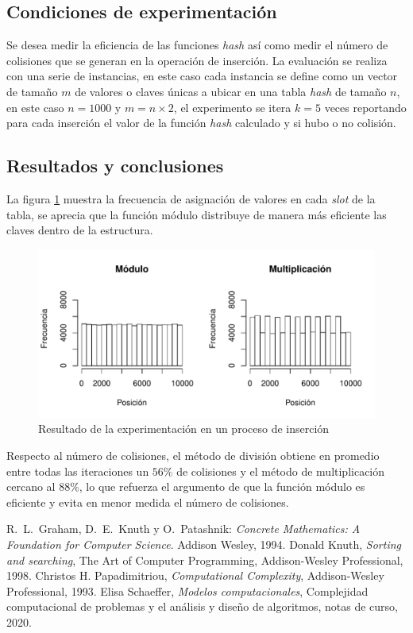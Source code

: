 \documentclass[letterpaper,11pt]{article}
\begin{document}
\subsection{Condiciones de experimentación}

Se desea medir la eficiencia de las funciones \textit{hash} así como medir el número de colisiones que se generan en la operación de inserción. La evaluación se realiza con una serie de instancias, en este caso cada instancia se define como un vector de tamaño $m$ de valores o claves únicas a ubicar en una tabla \textit{hash} de tamaño $n$, en este caso $n = 1000$ y $m=n\times 2$, el experimento se itera $k=5$ veces reportando para cada inserción el valor de la función \textit{hash} calculado y si hubo o no colisión.


\subsection{Resultados y conclusiones}

La figura \ref{fig:colision} muestra la frecuencia de asignación de valores en cada \textit{slot} de la tabla, se aprecia que la función módulo distribuye de manera más eficiente las claves dentro de la estructura.

\begin{figure}[h]
 \centering
  \includegraphics[width=\textwidth]{boxplot_tipo.pdf}
  \caption{Resultado de la experimentación en un proceso de inserción}
  \label{fig:colision}
\end{figure}

Respecto al número de colisiones, el método de división obtiene en promedio entre todas las iteraciones un $56\%$ de colisiones y el método de multiplicación cercano al $88\%$, lo que refuerza el argumento de que la función módulo es eficiente y evita en menor medida el número de colisiones.


\begin{thebibliography}{0} 
 R.~L.~Graham, D.~E.~Knuth y O.~Patashnik: \textit{Concrete Mathematics: A Foundation for Computer Science}. Addison Wesley, 1994.
   Donald Knuth, \textit{Sorting and searching}, The Art of Computer Programming, Addison-Wesley Professional, 1998.
    Christos H. Papadimitriou, \textit{Computational Complexity}, Addison-Wesley Professional, 1993.
   Elisa Schaeffer, \textit{Modelos computacionales}, Complejidad computacional de problemas y el análisis y diseño de algoritmos, notas de curso, 2020.
\end{thebibliography}
\end{document}
